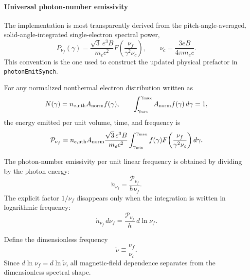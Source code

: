\documentclass[12pt,a4paper]{article}
\newcommand{\code}[1]{\texttt{#1}}
\begin{document}
\paragraph{Universal photon-number emissivity}
\label{sec:photon_number_emissivity}

The implementation is most transparently derived from the
pitch-angle-averaged, solid-angle-integrated single-electron spectral
power,
\begin{equation}
	P_{\nu_f}(\gamma)
	=
	\frac{\sqrt{3}\,e^3B}{m_ec^2}
	F\!\left(\frac{\nu_f}{\gamma^2\nu_c}\right),
	\qquad
	\nu_c
	=
	\frac{3eB}{4\pi m_ec}.
	\label{eq:Pnu_electron}
\end{equation}
This convention is the one used to construct the updated physical
prefactor in \code{photonEmitSynch}.

For any normalized nonthermal electron distribution written as
\begin{equation}
	N(\gamma)
	=
	n_{e,\mathrm{nth}}A_{\rm norm}f(\gamma),
	\qquad
	\int_{\gamma_{\min}}^{\gamma_{\max}}
	A_{\rm norm}f(\gamma)\,d\gamma
	=
	1,
	\label{eq:general_electron_distribution}
\end{equation}
the energy emitted per unit volume, time, and frequency is
\begin{equation}
	\mathcal{P}_{\nu_f}
	=
	n_{e,\mathrm{nth}}A_{\rm norm}
	\frac{\sqrt{3}\,e^3B}{m_ec^2}
	\int_{\gamma_{\min}}^{\gamma_{\max}}
	f(\gamma)
	F\!\left(\frac{\nu_f}{\gamma^2\nu_c}\right)
	d\gamma .
	\label{eq:energy_emissivity_general}
\end{equation}

The photon-number emissivity per unit linear frequency is obtained by
dividing by the photon energy:
\begin{equation}
	\dot n_{\nu_f}
	=
	\frac{\mathcal{P}_{\nu_f}}{h\nu_f}.
	\label{eq:number_emissivity_linear}
\end{equation}
The explicit factor \(1/\nu_f\) disappears only when the integration is
written in logarithmic frequency:
\begin{equation}
	\dot n_{\nu_f}\,d\nu_f
	=
	\frac{\mathcal{P}_{\nu_f}}{h}\,d\ln\nu_f.
	\label{eq:number_emissivity_log}
\end{equation}

Define the dimensionless frequency
\begin{equation}
	\tilde{\nu}
	\equiv
	\frac{\nu_f}{\nu_c}.
	\label{eq:nu_tilde}
\end{equation}
Since \(d\ln\nu_f=d\ln\tilde{\nu}\), all magnetic-field dependence
separates from the dimensionless spectral shape.
\end{document}

